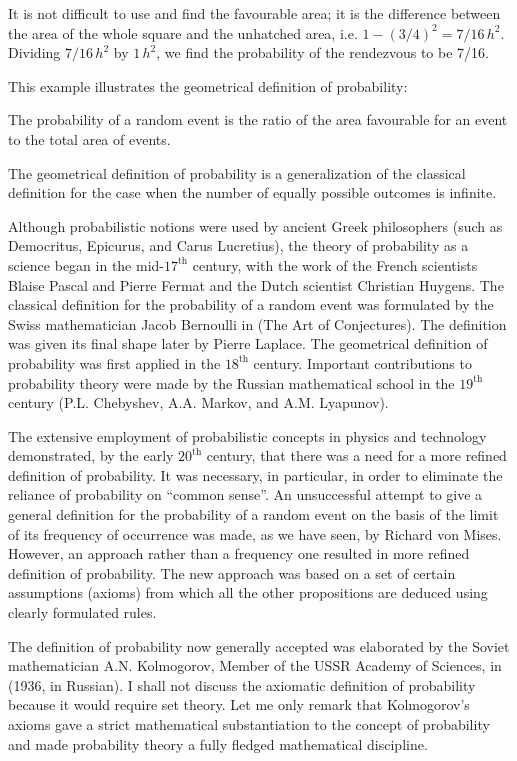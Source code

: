 It is not difficult to use  and find the
favourable area; it is the difference between the area of the whole
square and the unhatched area, i.e. $1 - \left( 3/4 \right)^2 =
7/16 \, h^{2}$. Dividing $7/16 \, h^{2}$ by $1\, h^{2}$, we find the probability of the rendezvous to be 7/16.

This example illustrates the geometrical definition of probability:
\begin{mybox}{}
The probability of a random event is the ratio of the area favourable for an
event to the total area of events.
\end{mybox}
The geometrical definition of probability is a generalization of the classical definition for the case when the number of equally possible outcomes is infinite.


 Although probabilistic notions were used by ancient
Greek philosophers (such as Democritus, Epicurus, and Carus
Lucretius), the theory of probability as a science began in the
mid-$17^{\text{th}}$ century, with the work of the French scientists Blaise
Pascal and Pierre Fermat and the Dutch scientist Christian
Huygens. The classical definition for the probability of a random
event was formulated by the Swiss mathematician Jacob Bernoulli in
 (The Art of Conjectures). The definition was
given its final shape later by Pierre Laplace. The geometrical
definition of probability was first applied in the $18^{\text{th}}$
century. Important contributions to probability theory were made by
the Russian mathematical school in the $19^{\text{th}}$ century (P.L. Chebyshev,
A.A. Markov, and A.M. Lyapunov). 

The extensive employment of probabilistic concepts in physics and technology demonstrated, by the early $20^{\text{th}}$ century, that there was a need for a more refined definition of probability. It was necessary, in particular, in order
to eliminate the reliance of probability on ``common sense''.  An
unsuccessful attempt to give a general definition for the probability
of a random event on the basis of the limit of its frequency of
occurrence was made, as we have seen, by Richard von Mises.  However,
an  approach rather than a frequency one resulted in more
refined definition of probability. The new approach was based on a
set of certain assumptions (axioms) from which all the other
propositions are deduced using clearly formulated rules.  


The  definition of probability now generally accepted was
elaborated by the Soviet mathematician A.N. Kolmogorov, Member of the
USSR Academy of Sciences, in  (1936, in Russian). I shall not discuss the axiomatic
definition of probability because it would require set theory. Let me
only remark that Kolmogorov's axioms gave a strict mathematical
substantiation to the concept of probability and made probability
theory a fully fledged mathematical discipline.  

